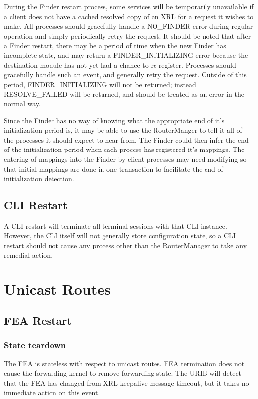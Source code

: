 \documentclass[11pt]{article}
\begin{document}
During the Finder restart process, some services will be temporarily
unavailable if a client does not have a cached resolved copy of an XRL
for a request it wishes to make.  All processes should gracefully
handle a NO\_FINDER error during regular operation and simply
periodically retry the request.  It should be noted that after a
Finder restart, there may be a period of time when the new Finder has
incomplete state, and may return a FINDER\_INITIALIZING error because
the destination module has not yet had a chance to re-register.
Processes should gracefully handle such an event, and generally retry the
request.  Outside of this period, FINDER\_INITIALIZING will not be
returned; instead RESOLVE\_FAILED will be returned, and should be
treated as an error in the normal way.

Since the Finder has no way of knowing what the appropriate end of
it's initialization period is, it may be able to use the RouterManger
to tell it all of the processes it should expect to hear from.  The
Finder could then infer the end of the initialization period when each
process has registered it's mappings.  The entering of mappings into
the Finder by client processes may need modifying so that initial
mappings are done in one transaction to facilitate the end of
initialization detection.

\subsection{CLI Restart}
A CLI restart will terminate all terminal sessions with that CLI
instance.  However, the CLI itself will not generally store
configuration state, so a CLI restart should not cause any process
other than the RouterManager to take any remedial action.

\section{Unicast Routes}

\subsection{FEA Restart}
\subsubsection*{State teardown}
The FEA is stateless with respect to unicast routes.  FEA termination
does not cause the forwarding kernel to remove forwarding state.  The
URIB will detect that the FEA has changed from XRL keepalive message
timeout, but it takes no immediate action on this event.
\end{document}
